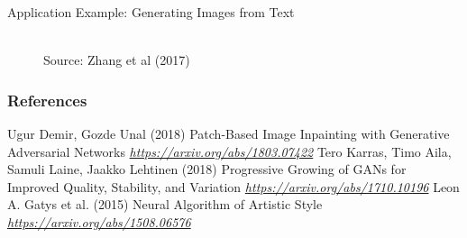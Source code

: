  \begin{frame} {Application Example: Generating Images from Text}
   
     \begin{figure}
     \centering
     \tiny{\\Source: Zhang et al (2017)}
     \end{figure}

 \end{frame}




\begin{vbframe}
\frametitle{References}
\footnotesize{
\begin{thebibliography}{99}
 Ugur Demir, Gozde Unal (2018)
\newblock Patch-Based Image Inpainting with Generative Adversarial Networks
\newblock \emph{\url{https://arxiv.org/abs/1803.07422}}
 Tero Karras, Timo Aila, Samuli Laine, Jaakko Lehtinen (2018)
\newblock Progressive Growing of GANs for Improved Quality, Stability, and Variation
\newblock \emph{\url{https://arxiv.org/abs/1710.10196}}
 Leon A. Gatys et al. (2015)
\newblock Neural Algorithm of Artistic Style
\newblock \emph{\url{https://arxiv.org/abs/1508.06576}}



\end{thebibliography}
}
\end{vbframe}

\endlecture


